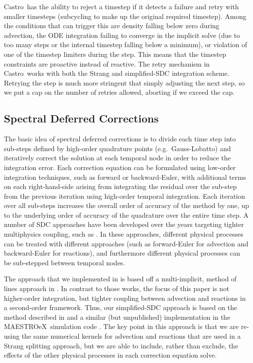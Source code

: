 \documentclass[linenumbers]{aastex631}
\newcommand{\castro}{{\sf Castro}}
\newcommand{\maestroex}{{\sf MAESTROeX}}
\newcommand{\MarginPar}[1]{\marginpar{\vskip-\baselineskip\raggedright\tiny\sffamily\hrule\smallskip{\color{red}#1}\par\smallskip\hrule}}
\begin{document}
\castro\ has the ability to reject a timestep if it detects a failure and retry
with smaller timesteps (subcycling to make up the original required timestep).
Among the conditions that can trigger this are density falling below zero during
advection, the ODE integration failing to converge in the implicit solve (due to
too many steps or the internal timestep falling below a minimum), or violation
of one of the timestep limiters during the step.  This means that the timestep
constraints are proactive instead of reactive.  The retry mechanism in \castro\
works with both the Strang and simplified-SDC integration scheme.  Retrying the
step is much more stringent that simply adjusting the next step, so we put a cap
on the number of retries allowed, aborting if we exceed the cap. 



\subsection{Spectral Deferred Corrections}

The basic idea of spectral deferred corrections \citep{dutt:2000} is to divide each time step into sub-steps defined by high-order quadrature points (e.g.~Gauss-Lobatto) and iteratively correct the solution at each temporal node in order to reduce the integration error.
Each correction equation can be formulated using low-order integration techniques, such as forward or backward-Euler, with additional terms on each right-hand-side arising from integrating the residual over the sub-step from the previous iteration using high-order temporal integration.
Each iteration over all sub-steps increases the overall order of accuracy of the method by one, up to the underlying order of accuracy of the quadrature over the entire time step.
A number of SDC approaches have been developed
over the years targeting tighter multiphysics coupling, such as 
\cite{bourlioux2003high,SDC-old}.  In these approaches, different physical processes can be treated with different approaches (such as forward-Euler for advection and backward-Euler for reactions), and furthermore different physical processes can be sub-stepped between temporal nodes.

The approach that we implemented in \citet{castro_sdc} is based off a
multi-implicit, method of lines approach in \citet{bourlioux2003high}.
In contrast to those works, the focus of this paper is not higher-order integration, but tighter coupling
between advection and reactions in a second-order framework.
Thus, our simplified-SDC approach is based on the method described in \citet{SDC-old}
and a similar (but unpublished) implementation in the \maestroex\ simulation
code \citep{maestroex}.
The key point in this approach is that we are re-using the same numerical kernels 
for advection and reactions that are used in a Strang splitting approach,
but we are able to include, rather than exclude, the effects of the other 
physical processes in each correction equation solve.
\end{document}
